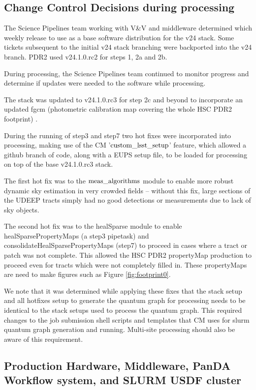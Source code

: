 \subsection{Change Control Decisions during processing}

The Science Pipelines team working with V\&V and middleware determined which weekly release to use as a base
software distribution for the v24 stack.  Some tickets subsequent to the initial v24 stack branching
were backported into the v24 branch.  PDR2 used v24.1.0.rc2 for steps 1, 2a and 2b.

During processing, the Science Pipelines team continued to monitor progress and determine if updates were
needed to the software while processing.

The stack was updated to v24.1.0.rc3 for step 2c and beyond to incorporate an updated fgcm (photometric
calibration map covering the whole HSC PDR2 footprint) .

During the running of step3 and step7 two hot fixes were incorporated into processing, making use
of the CM '$\rm custom\_lsst\_setup$' feature, which allowed a github branch of code, along with a EUPS setup
file, to be loaded for processing on top of the base v24.1.0.rc3 stack.

The first hot fix was to the $\rm meas\_algorithms$ module to enable more robust dynamic sky estimation in very
crowded fields -- without this fix, large sections of the UDEEP tracts simply had no good detections or
measurements due to lack of sky objects.

The second hot fix was to the healSparse module to enable healSparsePropertyMaps (a step3 pipetask) and 
consolidateHealSparsePropertyMaps (step7) to proceed in cases where a tract or patch was not complete.
This allowed the HSC PDR2 propertyMap production to proceed even for tracts which were 
not completely filled in. These propertyMaps are need to make figures such as Figure \ref{fig:footprint0}.

We note that it was determined while applying these fixes that the stack setup and all 
hotfixes setup to generate the quantum graph for processing needs to be identical to 
the stack setups used to process the quantum graph.  This required changes to the 
job submission shell scripts and templates that CM uses for slurm quantum 
graph generation and running.   Multi-site processing should also be aware of this requirement.

\subsection{Production Hardware, Middleware, PanDA Workflow system, and SLURM USDF cluster}

